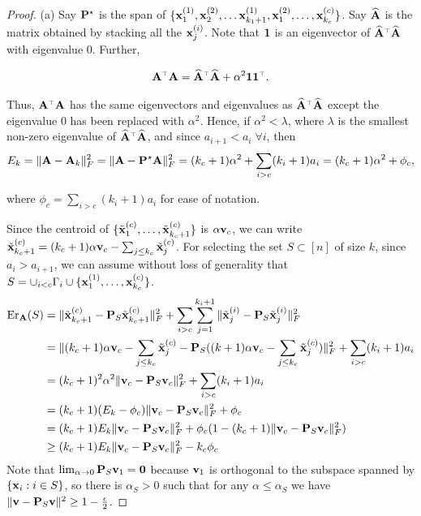 \documentclass{article}
\begin{document}
\begin{proof}
	(a) Say $\P^\star$ is the span of $\{\x^{(1)}_1, \x^{(2)}_2, \ldots \x^{(1)}_{k_1+1}, \x^{(2)}_{1}, \ldots, \x^{(c)}_{k_c} \}$. Say $\Abh$ is the matrix obtained by stacking all the $\x^{(i)}_j$. Note that $\one$ is an eigenvector of $\Abh^\top\Abh$ with eigenvalue $0$. Further,
	
	\begin{align*}
	\A^\top \A =	\Abh^\top\Abh  + \alpha^2 \one \one^\top.
	\end{align*}
	
	Thus, $\A^\top\A$ has the same eigenvectors and eigenvalues as $\Abh^\top\Abh$ except the eigenvalue $0$ has been replaced with $\alpha^2$. Hence, if $\alpha^2 < \lambda$, where $\lambda$ is the smallest non-zero eigenvalue of $\Abh^\top\Abh$, and since $a_{i+1}<a_i \;\forall i$, then
	\begin{align*}
	E_k = \|\A- \A_k\|_F^2  = \| \A - \P^\star \A \|_F^2 =  (k_c+1)\alpha^2 + \sum_{i>c}(k_i+1) a_i =  (k_c+1)\alpha^2 + \phi_c, 
	\end{align*}
	
	where $\phi_c =\sum_{i>c}(k_i+1) a_i $ for ease of notation.
	
	Since the centroid of $\{\tilde\x^{(c)}_1,\ldots, \tilde\x^{(c)}_{k_c+1}\}$ is $\alpha \v_c$, we can write 
	$\tilde\x^{(c)}_{k_c+1} = (k_c+1)\alpha\v_c - \sum_{j\leq k_c} \tilde\x^{(c)}_j$.
	For selecting the set $S\subset [n]$ of size $k$, since $a_i>a_{i+1}$, we can assume without loss of generality that $S = \cup_{i<c} \Gamma_i \cup \{\x^{(1)}_1,\ldots,\x^{(c)}_{k_c}\}$.
	\begin{align*}
	\Er_{\A}(S) &= \| \tilde\x^{(c)}_{k_c+1}- \P_S \tilde\x^{(c)}_{k_c+1}  \|_F^2
	+  \sum_{i>c}\sum_{j=1}^{k_i+1}\| \tilde\x^{(i)}_j - \P_S
	\tilde\x^{(i)}_j \|_F^2\\ 
	&=\|(k_c+1)\alpha\v_c - \sum_{j\leq k_c}\tilde\x^{(c)}_j- \P_S
	((k+1) \alpha\v_c - \sum_{j\leq k_c}\tilde\x^{(c)}_j )\|_F^2 + \sum_{i>c}(k_i+1)a_i
	\\ 
	&= (k_c+1)^2\alpha^2 \|\v_c - \P_S\v_c\|^2_F + \sum_{i>c}(k_i+1)a_i \\
	& = (k_c+1) (E_k - \phi_c) \|\v_c - \P_S\v_c\|^2_F + \phi_c \\
	& = (k_c+1) E_k \|\v_c - \P_S\v_c\|^2_F + \phi_c (1 - (k_c+1)\|\v_c - \P_S\v_c\|^2_F ) \\
	& \geq (k_c+1) E_k \|\v_c - \P_S\v_c\|^2_F - k_c \phi_c 
	\end{align*}	
	Note that $\lim_{\alpha\rightarrow 0}\P_S\v_1 = \zero$ because $\v_1$
	is orthogonal to the subspace spanned by $\{\x_i:i\in S\}$, so there is
	$\alpha_S>0$ such that for any $\alpha\leq\alpha_S$ we have
	$\|\v-\P_S\v\|^2\geq 1-\frac\epsilon2$.
	

\end{proof}
\end{document}
